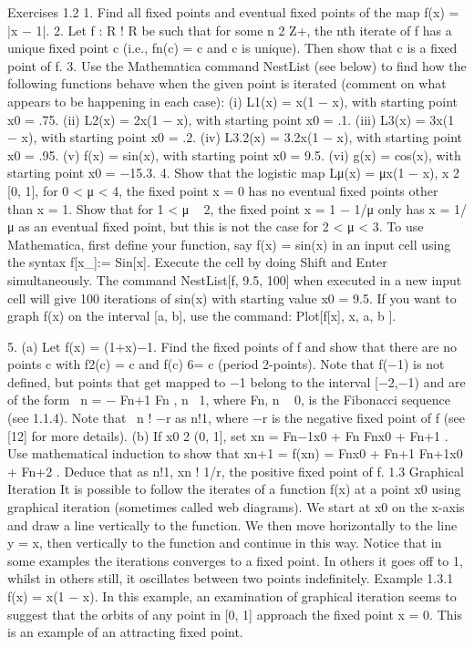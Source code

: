 \documentclass[12pt]{article}
\begin{document}
\begin{enumerate}
\begin{enumerate}
Exercises 1.2
1. Find all fixed points and eventual fixed points of the map f(x) = |x − 1|.
2. Let f : R ! R be such that for some n 2 Z+, the nth iterate of f has a unique
fixed point c (i.e., fn(c) = c and c is unique). Then show that c is a fixed point of f.
3. Use the Mathematica command NestList (see below) to find how the following
functions behave when the given point is iterated (comment on what appears to be
happening in each case):
(i) L1(x) = x(1 − x), with starting point x0 = .75.
(ii) L2(x) = 2x(1 − x), with starting point x0 = .1.
(iii) L3(x) = 3x(1 − x), with starting point x0 = .2.
(iv) L3.2(x) = 3.2x(1 − x), with starting point x0 = .95.
(v) f(x) = sin(x), with starting point x0 = 9.5.
(vi) g(x) = cos(x), with starting point x0 = −15.3.
4. Show that the logistic map Lμ(x) = μx(1 − x), x 2 [0, 1], for 0 < μ < 4, the fixed
point x = 0 has no eventual fixed points other than x = 1.
Show that for 1 < μ   2, the fixed point x = 1 − 1/μ only has x = 1/μ as an
eventual fixed point, but this is not the case for 2 < μ < 3.
To use Mathematica, first define your function, say f(x) = sin(x) in an input
cell using the syntax
f[x_]:= Sin[x].
Execute the cell by doing Shift and Enter simultaneously. The command
NestList[f, 9.5, 100]
when executed in a new input cell will give 100 iterations of sin(x) with starting
value x0 = 9.5. If you want to graph f(x) on the interval [a, b], use the command:
Plot[f[x], { x, a, b } ].

5. (a) Let f(x) = (1+x)−1. Find the fixed points of f and show that there are
no points c with f2(c) = c and f(c) 6= c (period 2-points). Note that f(−1) is not
defined, but points that get mapped to −1 belong to the interval [−2,−1) and are of
the form
 n = −
Fn+1
Fn
, n  1,
where {Fn}, n   0, is the Fibonacci sequence (see 1.1.4). Note that  n ! −r as
n!1, where −r is the negative fixed point of f (see [12] for more details).
(b) If x0 2 (0, 1], set xn =
Fn−1x0 + Fn
Fnx0 + Fn+1
. Use mathematical induction to show that
xn+1 = f(xn) =
Fnx0 + Fn+1
Fn+1x0 + Fn+2
.
Deduce that as n!1, xn ! 1/r, the positive fixed point of f.
1.3 Graphical Iteration
It is possible to follow the iterates of a function f(x) at a point x0 using graphical
iteration (sometimes called web diagrams).
We start at x0 on the x-axis and draw a line vertically to the function. We then
move horizontally to the line y = x, then vertically to the function and continue in this
way. Notice that in some examples the iterations converges to a fixed point. In others
it goes off to 1, whilst in others still, it oscillates between two points indefinitely.
Example 1.3.1 f(x) = x(1 − x). In this example, an examination of graphical
iteration seems to suggest that the orbits of any point in [0, 1] approach the fixed
point x = 0. This is an example of an attracting fixed point.


\end{enumerate}
\end{enumerate}
\end{document}
